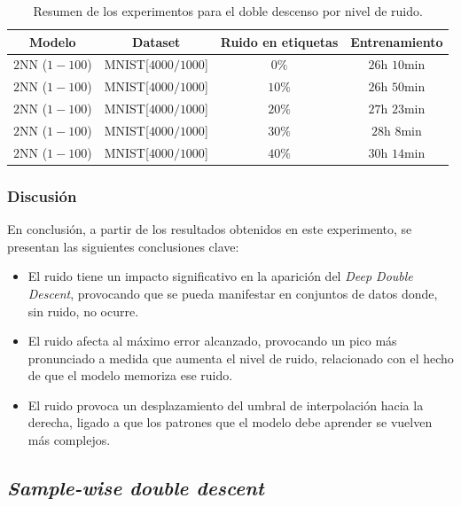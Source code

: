 \begin{table}[h!]
    \centering
    \begin{tabular}{|c|c|c|c|}
    \hline
    \textbf{Modelo}       & \textbf{Dataset} & \textbf{Ruido en etiquetas} & \textbf{Entrenamiento} \\ 
    \hline
    $2$NN ($1-100$)          & MNIST[$4000/1000$]        & $0\%$       & $26$h $10$min       \\ 
    $2$NN ($1-100$)          & MNIST[$4000/1000$]        & $10\%$         & $26$h $50$min       \\ 
    $2$NN ($1-100$)          & MNIST[$4000/1000$]        & $20\%$         & $27$h $23$min       \\ 
    $2$NN ($1-100$)          & MNIST[$4000/1000$]        & $30\%$          & $28$h $8$min       \\ 
    $2$NN ($1-100$)          & MNIST[$4000/1000$]       & $40\%$          & $30$h $14$min       \\  
    \hline
    \end{tabular}
    \caption[Resumen de los experimentos para el doble descenso por nivel de ruido.]{Resumen de los experimentos para el doble descenso por nivel de ruido.}
    \label{tab:noisewisedd}
\end{table}

\subsubsection{Discusión}\label{subsubsec:discusion-ruido}

En conclusión, a partir de los resultados obtenidos en este experimento, se presentan las siguientes conclusiones clave:

\begin{itemize}
    \item El ruido tiene un impacto significativo en la aparición del \textit{Deep Double Descent}, provocando que se pueda manifestar en conjuntos de datos donde, sin ruido, no ocurre.
    \item El ruido afecta al máximo error alcanzado, provocando un pico más pronunciado a medida que aumenta el nivel de ruido, relacionado con el hecho de que el modelo memoriza ese ruido.
    \item El ruido provoca un desplazamiento del umbral de interpolación hacia la derecha, ligado a que los patrones que el modelo debe aprender se vuelven más complejos.
\end{itemize}

\subsection{\textit{Sample-wise double descent}}\label{subsec:sample-wise-dd}

